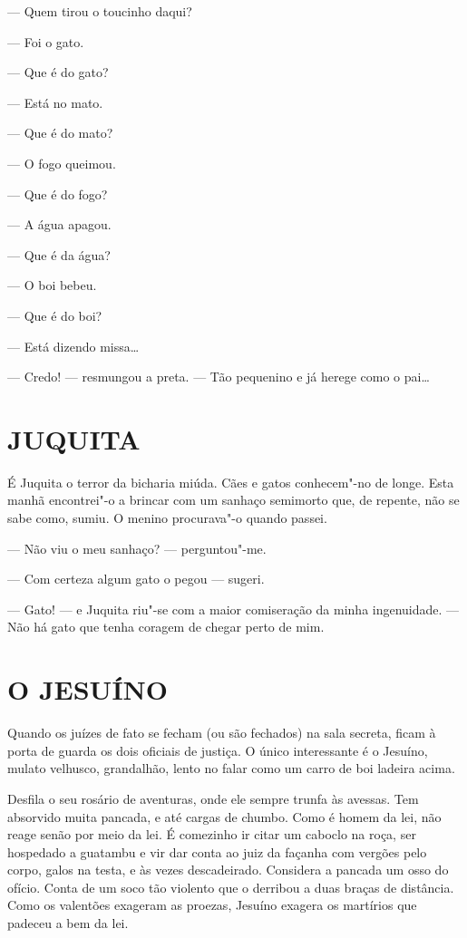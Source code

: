 --- Quem tirou o toucinho daqui?

--- Foi o gato.

--- Que é do gato?

--- Está no mato.

--- Que é do mato?

--- O fogo queimou.

--- Que é do fogo?

--- A água apagou.

--- Que é da água?

--- O boi bebeu.

--- Que é do boi?

--- Está dizendo missa\ldots{}

--- Credo! --- resmungou a preta. --- Tão pequenino e já herege como o
pai\ldots{}

\section*{JUQUITA}

É Juquita o terror da bicharia miúda. Cães e gatos conhecem"-no de longe.
Esta manhã encontrei"-o a brincar com um sanhaço semimorto que, de
repente, não se sabe como, sumiu. O menino procurava"-o quando passei.

--- Não viu o meu sanhaço? --- perguntou"-me.

--- Com certeza algum gato o pegou --- sugeri.

--- Gato! --- e Juquita riu"-se com a maior comiseração da minha
ingenuidade. --- Não há gato que tenha coragem de chegar perto de mim.

\section*{O JESUÍNO}

Quando os juízes de fato se fecham (ou são fechados) na sala secreta,
ficam à porta de guarda os dois oficiais de justiça. O único
interessante é o Jesuíno, mulato velhusco, grandalhão, lento no falar
como um carro de boi ladeira acima.

Desfila o seu rosário de aventuras, onde ele sempre trunfa às avessas.
Tem absorvido muita pancada, e até cargas de chumbo. Como é homem da
lei, não reage senão por meio da lei. É comezinho ir citar um caboclo na
roça, ser hospedado a guatambu e vir dar conta ao juiz da façanha com
vergões pelo corpo, galos na testa, e às vezes descadeirado. Considera a
pancada um osso do ofício. Conta de um soco tão violento que o derribou
a duas braças de distância. Como os valentões exageram as proezas,
Jesuíno exagera os martírios que padeceu a bem da lei.

